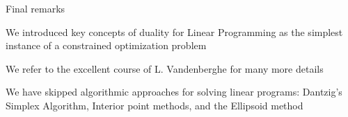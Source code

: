 \documentclass[11pt,compress,t,notes=noshow, xcolor=table]{beamer}
\begin{document}
\begin{framei}{Final remarks}
\item We introduced key concepts of duality for Linear Programming as the simplest instance of a constrained optimization problem
\item We refer to the excellent course of L. Vandenberghe  for many more details
\item We have skipped algorithmic approaches for solving linear programs: Dantzig's Simplex Algorithm, Interior point methods, and the Ellipsoid method
\end{framei}

\endlecture
\end{document}
